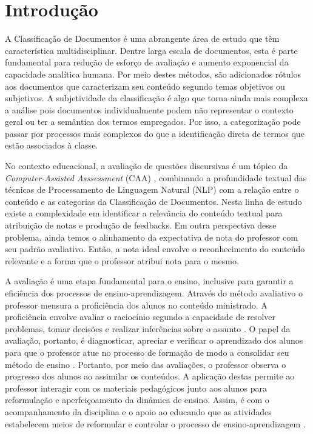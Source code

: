 \chapter{Introdução}
\label{cap1-intro}

A Classificação de Documentos é uma abrangente área de estudo que têm característica multidisciplinar. Dentre larga escala de documentos, esta é parte fundamental para redução de esforço de avaliação e aumento exponencial da capacidade analítica humana. Por meio destes métodos, são adicionados rótulos aos documentos que caracterizam seu conteúdo segundo temas objetivos ou subjetivos. A subjetividade da classificação é algo que torna ainda mais complexa a análise pois documentos individualmente podem não representar o contexto geral ou ter a semântica dos termos empregados. Por isso, a categorização pode passar por processos mais complexos do que a identificação direta de termos que estão associados à classe.

No contexto educacional, a avaliação de questões discursivas é um tópico da \textit{Computer-Assisted Asssessment} (CAA) \cite{bogarin2018}, combinando a profundidade textual das técnicas de Processamento de Linguagem Natural (NLP) com a relação entre o conteúdo e as categorias da Classificação de Documentos. Nesta linha de estudo existe a complexidade em identificar a relevância do conteúdo textual para atribuição de notas e produção de feedbacks. Em outra perspectiva desse problema, ainda temos o alinhamento da expectativa de nota do professor com seu padrão avaliativo. Então, a nota ideal envolve o reconhecimento do conteúdo relevante e a forma que o professor atribui nota para o mesmo. 

A avaliação é uma etapa fundamental para o ensino, inclusive para garantir a eficiência dos processos de ensino-aprendizagem. Através do método avaliativo o professor mensura a proficiência dos alunos no conteúdo ministrado. A proficiência envolve avaliar o raciocínio segundo a capacidade de resolver problemas, tomar decisões e realizar inferências sobre o assunto \cite{casiraghi2017}. O papel da avaliação, portanto, é diagnosticar, apreciar e verificar o aprendizado dos alunos para que o professor atue no processo de formação de modo a consolidar seu método de ensino \cite{oliveira2005}. Portanto, por meio das avaliações, o professor observa o progresso dos alunos ao assimilar os conteúdos. A aplicação destas permite ao professor interagir com os materiais pedagógicos junto aos alunos para reformulação e aperfeiçoamento da dinâmica de ensino. Assim, é com o acompanhamento da disciplina e o apoio ao educando que as atividades estabelecem meios de reformular e controlar o processo de ensino-aprendizagem \cite{barreira2006}.

